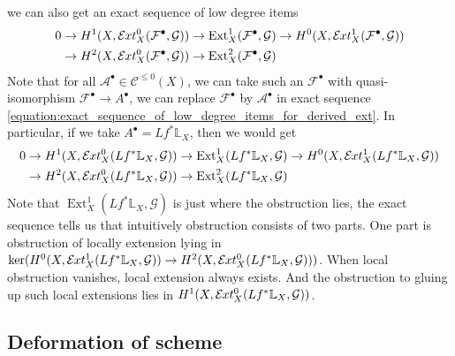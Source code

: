 \documentclass{ctexart}
\newcommand{\ext}{\operatorname{Ext}}
\newcommand{\sheafext}{\mathcal{E}\kern -.5pt xt}
\begin{document}
we can also get an exact sequence of low degree items
\begin{equation}
    \begin{split}
            0 & \rightarrow H^{1}(X, \sheafext_{X}^{0}(\mathcal{F}^{\bullet}, \mathcal{G})) \rightarrow \ext_{X}^{1}(\mathcal{F}^{\bullet}, \mathcal{G}) \rightarrow H^{0}(X, \sheafext_{X}^{1}(\mathcal{F}^{\bullet}, \mathcal{G})) \\
            & \rightarrow H^{2}(X, \sheafext_{X}^{0}(\mathcal{F}^{\bullet}, \mathcal{G})) \rightarrow \ext_{X}^{2}(\mathcal{F}^{\bullet}, \mathcal{G}) 
    \end{split}
    \label{equation:exact_sequence_of_low_degree_items_for_derived_ext}
\end{equation}
Note that for all $\mathcal{A}^{\bullet}\in \mathcal{C}^{\le 0}(X)$, we can take such an $\mathcal{F}^{\bullet}$ with quasi-isomorphism $\mathcal{F}^{\bullet} \rightarrow A^{\bullet}$,
we can replace $\mathcal{F}^{\bullet}$ by $\mathcal{A}^{\bullet}$ in exact sequence \ref{equation:exact_sequence_of_low_degree_items_for_derived_ext}.
In particular, if we take $A^{\bullet} = Lf^{\ast}\mathbb{L}_{X}$, then we would get
\begin{equation}
    \begin{split}
            0 & \rightarrow H^{1}(X, \sheafext_{X}^{0}(Lf^{\ast}\mathbb{L}_{X}, \mathcal{G})) \rightarrow \ext_{X}^{1}(Lf^{\ast}\mathbb{L}_{X}, \mathcal{G}) \rightarrow H^{0}(X, \sheafext_{X}^{1}(Lf^{\ast}\mathbb{L}_{X}, \mathcal{G})) \\
            & \rightarrow H^{2}(X, \sheafext_{X}^{0}(Lf^{\ast}\mathbb{L}_{X}, \mathcal{G})) \rightarrow \ext_{X}^{2}(Lf^{\ast}\mathbb{L}_{X}, \mathcal{G}) 
    \end{split}
\end{equation}
Note that $\ext_{X}^{1}(Lf^{\ast}\mathbb{L}_{X}, \mathcal{G})$ is just where the obstruction lies, 
the exact sequence tells us that intuitively obstruction consists of two parts.
One part is obstruction of locally extension lying in $\ker (H^{0}(X, \sheafext_{X}^{1}(Lf^{\ast}\mathbb{L}_{X}, \mathcal{G})) \rightarrow H^{2}(X, \sheafext_{X}^{0}(Lf^{\ast}\mathbb{L}_{X}, \mathcal{G})))$.
When local obstruction vanishes, local extension always exists.
And the obstruction to gluing up such local extensions lies in $H^{1}(X, \sheafext_{X}^{0}(Lf^{\ast}\mathbb{L}_{X}, \mathcal{G}))$.

\subsection{Deformation of scheme}
\label{subsection:Cotangent_Complex_Deformation_of_scheme}
\end{document}

